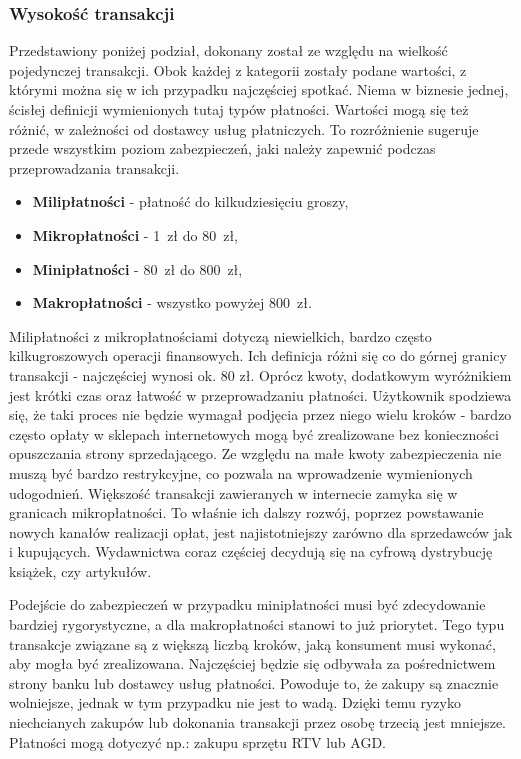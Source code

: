 \subsubsection*{Wysokość transakcji}
Przedstawiony poniżej podział, dokonany został ze względu na wielkość pojedynczej transakcji. Obok każdej z kategorii zostały podane wartości, z którymi można się w ich przypadku najczęściej spotkać. Niema w biznesie jednej, ścisłej definicji wymienionych tutaj typów płatności. Wartości mogą się też różnić, w zależności od dostawcy usług płatniczych. To rozróżnienie sugeruje przede wszystkim poziom zabezpieczeń, jaki należy zapewnić podczas przeprowadzania transakcji.
\begin{itemize}
	\item \textbf{Milipłatności} - płatność do kilkudziesięciu groszy,
	\item \textbf{Mikropłatności} - 1~zł do 80~zł,
	\item \textbf{Minipłatności} - 80~zł do 800~zł,
	\item \textbf{Makropłatności} - wszystko powyżej 800~zł. 
\end{itemize}
Milipłatności z mikropłatnościami dotyczą niewielkich, bardzo często kilkugroszowych operacji finansowych. Ich definicja różni się co do górnej granicy transakcji - najczęściej wynosi ok. 80 zł. Oprócz kwoty, dodatkowym wyróżnikiem jest krótki czas oraz łatwość w przeprowadzaniu płatności. Użytkownik spodziewa się, że taki proces nie będzie wymagał podjęcia przez niego wielu kroków - bardzo często opłaty w sklepach internetowych mogą być zrealizowane bez konieczności opuszczania strony sprzedającego. Ze względu na małe kwoty zabezpieczenia nie muszą być bardzo restrykcyjne, co pozwala na wprowadzenie wymienionych udogodnień. Większość transakcji zawieranych w internecie zamyka się w granicach mikropłatności. To właśnie ich dalszy rozwój, poprzez powstawanie nowych kanałów realizacji opłat, jest najistotniejszy zarówno dla sprzedawców jak i kupujących. Wydawnictwa coraz częściej decydują się na cyfrową dystrybucję książek, czy artykułów.

Podejście do zabezpieczeń w przypadku minipłatności musi być zdecydowanie bardziej rygorystyczne, a dla makropłatności stanowi to już priorytet. Tego typu transakcje związane są z większą liczbą kroków, jaką konsument musi wykonać, aby mogła być zrealizowana. Najczęściej będzie się odbywała za pośrednictwem strony banku lub dostawcy usług płatności. Powoduje to, że zakupy są znacznie wolniejsze, jednak w tym przypadku nie jest to wadą. Dzięki  temu ryzyko niechcianych zakupów lub dokonania transakcji przez osobę trzecią jest mniejsze. Płatności mogą dotyczyć np.: zakupu sprzętu RTV lub AGD.

